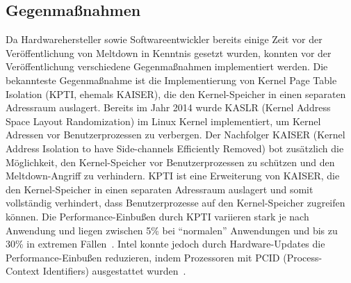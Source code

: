\subsection{Gegenmaßnahmen}
\label{subsec:meltdown_gegenmassnahmen}

Da Hardwarehersteller sowie Softwareentwickler bereits einige Zeit vor der Veröffentlichung von Meltdown in Kenntnis gesetzt wurden, konnten vor der Veröffentlichung verschiedene Gegenmaßnahmen implementiert werden.
Die bekannteste Gegenmaßnahme ist die Implementierung von Kernel Page Table Isolation (KPTI, ehemals KAISER), die den Kernel-Speicher in einen separaten Adressraum auslagert.
Bereits im Jahr 2014 wurde KASLR (Kernel Address Space Layout Randomization) im Linux Kernel implementiert, um Kernel Adressen vor Benutzerprozessen zu verbergen.
Der Nachfolger KAISER (Kernel Address Isolation to have Side-channels Efficiently Removed) bot zusätzlich die Möglichkeit, den Kernel-Speicher vor Benutzerprozessen zu schützen und den Meltdown-Angriff zu verhindern.
KPTI ist eine Erweiterung von KAISER, die den Kernel-Speicher in einen separaten Adressraum auslagert und somit vollständig verhindert, dass Benutzerprozesse auf den Kernel-Speicher zugreifen können.
Die Performance-Einbußen durch KPTI variieren stark je nach Anwendung und liegen zwischen 5\% bei \enquote{normalen} Anwendungen und bis zu 30\% in extremen Fällen~\cite{kaiser_2017}.
Intel konnte jedoch durch Hardware-Updates die Performance-Einbußen reduzieren, indem Prozessoren mit PCID (Process-Context Identifiers) ausgestattet wurden~\cite{pcworld_2018}.